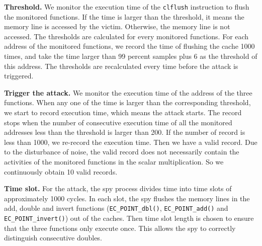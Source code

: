 
%
%
%



\noindent\textbf{Threshold.}
We monitor the execution time of the \verb+clflush+ instruction to flush the monitored functions.
If the time is larger than the threshold, it means the memory line is accessed by the victim.
Otherwise, the memory line is not accessed.
The thresholds are calculated for every monitored functions.
For each address of the monitored functions, we record the time of flushing the cache 1000 times, and take the time larger than 99 percent samples plus 6 as the threshold of this address.
The thresholds are recalculated every time before the attack is triggered.




\noindent\textbf{Trigger the attack.}
We monitor the execution time of the address of the three functions.
When any one of the time is larger than the corresponding threshold,
 we start to record execution time, which means the attack starts.
The record stops when the number of consecutive execution time of all the monitored addresses less than the threshold  is larger than 200.
If the number of record is less than 1000, we re-record the execution time.
Then we have a valid record.
 Due to the  disturbance of noise,
  the valid record does not necessarily contain the activities of the monitored functions in the scalar multiplication.
So we continuously obtain 10 valid records.


\noindent\textbf{Time slot.}
For the attack, the spy process divides time into time slots of approximately 1000 cycles.
In each slot, the spy flushes the memory lines in the add, double and invert functions (\verb+EC_POINT_dbl()+,  \verb+EC_POINT_add()+ and \verb+EC_POINT_invert()+) out of the caches.
Then time slot length is chosen to ensure that the three functions only execute once.
This allows the spy to correctly distinguish consecutive doubles.

